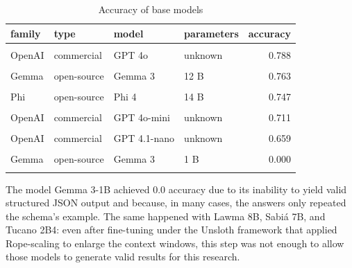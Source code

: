 \documentclass[
  12pt,
]{article}
\begin{document}
\begin{longtable}[t]{llllr}

\toprule
family & type & model & parameters & accuracy\\
\midrule
\cellcolor{gray!10}{Gemma} & \cellcolor{gray!10}{open-source} & \cellcolor{gray!10}{Gemma 3} & \cellcolor{gray!10}{27 B} & \cellcolor{gray!10}{0.820}\\
OpenAI & commercial & GPT 4o & unknown & 0.788\\
\cellcolor{gray!10}{OpenAI} & \cellcolor{gray!10}{commercial} & \cellcolor{gray!10}{o3-mini} & \cellcolor{gray!10}{unknown} & \cellcolor{gray!10}{0.764}\\
Gemma & open-source & Gemma 3 & 12 B & 0.763\\
\cellcolor{gray!10}{OpenAI} & \cellcolor{gray!10}{commercial} & \cellcolor{gray!10}{GPT 4.1} & \cellcolor{gray!10}{unknown} & \cellcolor{gray!10}{0.755}\\
\addlinespace
Phi & open-source & Phi 4 & 14 B & 0.747\\
\cellcolor{gray!10}{Llama} & \cellcolor{gray!10}{open-source} & \cellcolor{gray!10}{Llama 3.1} & \cellcolor{gray!10}{8 B} & \cellcolor{gray!10}{0.735}\\
OpenAI & commercial & GPT 4o-mini & unknown & 0.711\\
\cellcolor{gray!10}{OpenAI} & \cellcolor{gray!10}{commercial} & \cellcolor{gray!10}{GPT 4.1-mini} & \cellcolor{gray!10}{unknown} & \cellcolor{gray!10}{0.697}\\
OpenAI & commercial & GPT 4.1-nano & unknown & 0.659\\
\addlinespace
\cellcolor{gray!10}{Llama} & \cellcolor{gray!10}{open-source} & \cellcolor{gray!10}{Llama 3.2} & \cellcolor{gray!10}{3 B} & \cellcolor{gray!10}{0.542}\\
Gemma & open-source & Gemma 3 & 1 B & 0.000\\
\bottomrule


\caption{\label{tbl-accuracy-metadata}Accuracy of base models}

\tabularnewline
\end{longtable}

The model Gemma 3-1B achieved 0.0 accuracy due to its inability to yield
valid structured JSON output and because, in many cases, the answers
only repeated the schema's example. The same happened with Lawma 8B,
Sabiá 7B, and Tucano 2B4: even after fine-tuning under the Unsloth
framework that applied Rope-scaling to enlarge the context windows, this
step was not enough to allow those models to generate valid results for
this research.
\end{document}
